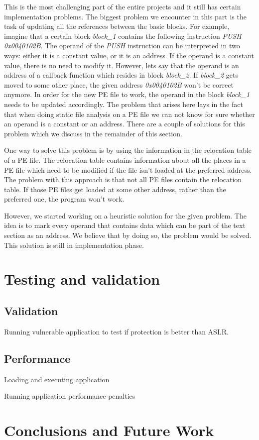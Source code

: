 \documentclass[11pt,final,conference,a4paper]{IEEEtran}
\begin{document}
This is the most challenging part of the entire projects and it still has certain implementation problems. The biggest problem we encounter in this part is the task of updating all the references between the basic blocks. For example, imagine that a certain block \emph{block\_1} contains the following instruction \emph{PUSH 0x0040102B}. The operand of the \emph{PUSH} instruction can be interpreted in two ways: either it is a constant value, or it is an address. If the operand is a constant value, there is no need to modify it. However, lets say that the operand is an address of a callback function which resides in block \emph{block\_2}. If \emph{block\_2} gets moved to some other place, the given address \emph{0x0040102B} won't be correct anymore. In order for the new PE file to work, the operand in the block \emph{block\_1} needs to be updated accordingly. The problem that arises here lays in the fact that when doing static file analysis on a PE file we can not know for sure whether an operand is a constant or an address. There are a couple of solutions for this problem which we discuss in the remainder of this section.

One way to solve this problem is by using the information in the relocation table of a PE file. The relocation table contains information about all the places in a PE file which need to be modified if the file isn't loaded at the preferred address. The problem with this approach is that not all PE files contain the relocation table. If those PE files get loaded at some other address, rather than the preferred one, the program won't work.

However, we started working on a heuristic solution for the given problem. The idea is to mark every operand that contains data which can be part of the text section as an address. We believe that by doing so, the problem would be solved. This solution is still in implementation phase.

\section{Testing and validation}
\label{sec:testing}

\subsection{Validation}

Running vulnerable application to test if protection is better than ASLR.

\subsection{Performance}

Loading and executing application

Running application performance penalties

\section{Conclusions and Future Work}
\label{sec:conclusions}




\nocite{arscryptolocker}
\end{document}

